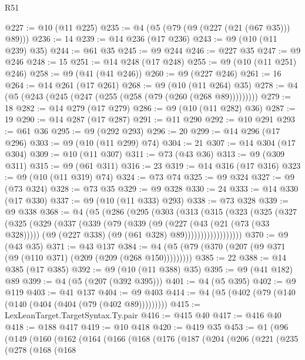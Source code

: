 \begin{lexlean}{R51}
\begin{coremodule}
@227 := @10 (@11 @225)
@235 := @4 (@5 (@79 (@9 (@227 (@21 (@67 @35))) @89)))
@236 := 14
@239 := @14 @236 (@17 @236)
@243 := @9 (@10 (@11 @239) @35)
@244 := @61 @35
@245 := @9 @244
@246 := @227 @35
@247 := @9 @246
@248 := 15
@251 := @14 @248 (@17 @248)
@255 := @9 (@10 (@11 @251) @246)
@258 := @9 (@41 (@41 @246))
@260 := @9 (@227 @246)
@261 := 16
@264 := @14 @261 (@17 @261)
@268 := @9 (@10 (@11 @264) @35)
@278 := @4 (@5 (@243 (@245 (@247 (@255 (@258 (@79 (@260 (@268 @89)))))))))
@279 := 18
@282 := @14 @279 (@17 @279)
@286 := @9 (@10 (@11 @282) @36)
@287 := 19
@290 := @14 @287 (@17 @287)
@291 := @11 @290
@292 := @10 @291
@293 := @61 @36
@295 := @9 (@292 @293)
@296 := 20
@299 := @14 @296 (@17 @296)
@303 := @9 (@10 (@11 @299) @74)
@304 := 21
@307 := @14 @304 (@17 @304)
@309 := @10 (@11 @307)
@311 := @73 (@43 @36)
@313 := @9 (@309 @311)
@315 := @9 (@61 @311)
@316 := 23
@319 := @14 @316 (@17 @316)
@323 := @9 (@10 (@11 @319) @74)
@324 := @73 @74
@325 := @9 @324
@327 := @9 (@73 @324)
@328 := @73 @35
@329 := @9 @328
@330 := 24
@333 := @14 @330 (@17 @330)
@337 := @9 (@10 (@11 @333) @293)
@338 := @73 @328
@339 := @9 @338
@368 := @4
    (@5
      (@286
        (@295
          (@303
            (@313
              (@315
                (@323
                  (@325
                    (@327
                      (@325
                        (@329
                          (@337
                            (@339
                              (@79
                                (@339
                                  (@9
                                    (@227 (@43 (@21 (@73 (@33 @328)))))
                                    (@9 (@227 @338) (@9 (@61 @328) @89))))))))))))))))))
@370 := @9 (@43 @35)
@371 := @43 @137
@384 := @4 (@5 (@79 (@370 (@207 (@9 @371 (@9 (@110 @371) (@209 (@209 (@268 @150)))))))))
@385 := 22
@388 := @14 @385 (@17 @385)
@392 := @9 (@10 (@11 @388) @35)
@395 := @9 (@41 @182) @89
@399 := @4 (@5 (@207 (@392 @395)))
@401 := @4 (@5 @395)
@402 := @9 @119
@403 := @41 @137
@404 := @9 @403
@414 := @4 (@5 (@402 (@79 (@140 (@140 (@404 (@404 (@79 (@402 @89)))))))))
@415 := LexLeanTarget.TargetSyntax.Ty.pair
@416 := @415 @40
@417 := @416 @40
@418 := @188 @417
@419 := @10 @418
@420 := @419 @35
@453 := @1
    (@96
      (@149
        (@160
          (@162
            (@164
              (@166
                (@168
                  (@176
                    (@187
                      (@204
                        (@206
                          (@221
                            (@235
                              (@278
                                (@168
                                  (@168

\end{coremodule}
\end{lexlean}
